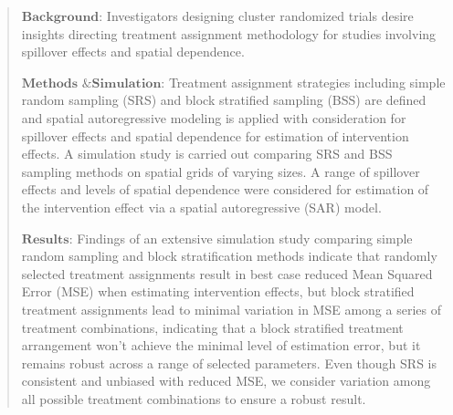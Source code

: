 \documentclass{article}[11pt]
\begin{document}
\begin{abstract}
   $\textbf{Background}$: Investigators designing cluster randomized trials desire insights directing treatment assignment methodology for studies involving spillover effects and spatial dependence.



   $\textbf{Methods \& Simulation}$: Treatment assignment strategies including simple random sampling (SRS) and block stratified sampling (BSS) are defined and spatial autoregressive modeling is applied with consideration for spillover effects and spatial dependence for estimation of intervention effects. A simulation study is carried out comparing SRS and BSS sampling methods on spatial grids of varying sizes. A range of spillover effects and levels of spatial dependence were considered for estimation of the intervention effect via a spatial autoregressive (SAR) model.


   $\textbf{Results}$: Findings of an extensive simulation study comparing simple random sampling and block stratification methods indicate that randomly selected treatment assignments result in best case reduced Mean Squared Error (MSE) when estimating intervention effects, but block stratified treatment assignments lead to minimal variation in MSE among a series of treatment combinations, indicating that a block stratified treatment arrangement won’t achieve the minimal level of estimation error, but it remains robust across a range of selected parameters. Even though SRS is consistent and unbiased with reduced MSE, we consider variation among all possible treatment combinations to ensure a robust result.


\end{abstract}
\end{document}
